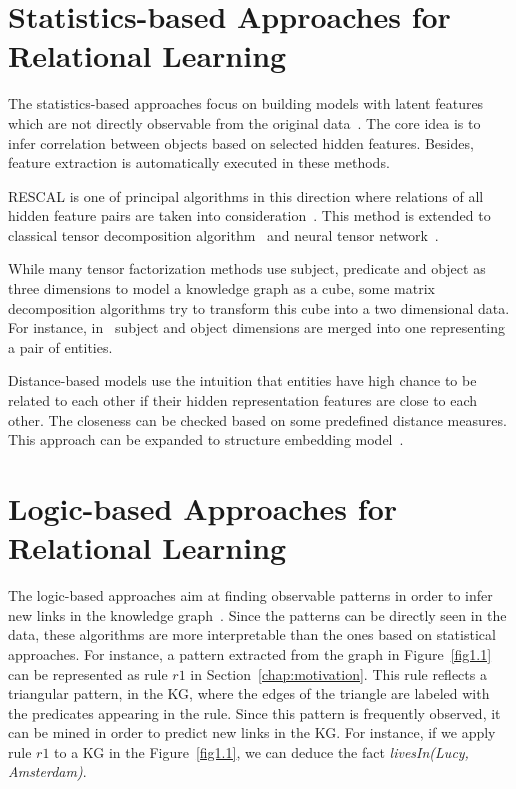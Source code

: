 \section{Statistics-based Approaches for Relational Learning}

The statistics-based approaches focus on building models with latent features which are not directly observable from the original data~\cite{ref1}. The core idea is to infer correlation between objects based on selected hidden features. Besides, feature extraction is automatically executed in these methods.

RESCAL is one of principal algorithms in this direction where relations of all hidden feature pairs are taken into consideration~\cite{ref2, ref3}. This method is extended to classical tensor decomposition algorithm~\cite{ref4} and neural tensor network~\cite{ref5}.

While many tensor factorization methods use subject, predicate and object as three dimensions to model a knowledge graph as a cube, some matrix decomposition algorithms try to transform this cube into a two dimensional data. For instance, in~\cite{ref6, ref7} subject and object dimensions are merged into one representing a pair of entities.

Distance-based models use the intuition that entities have high chance to be related to each other if their hidden representation features are close to each other. The closeness can be checked based on some predefined distance measures. This approach can be expanded to structure embedding model~\cite{ref8}.

\section{Logic-based Approaches for Relational Learning}

The logic-based approaches aim at finding observable patterns in order to infer new links in the knowledge graph~\cite{ref1}. Since the patterns can be directly seen in the data, these algorithms are more interpretable than the ones based on statistical approaches. For instance, a pattern extracted from the graph in Figure~\ref{fig1.1} can be represented as rule $r1$ in Section~\ref{chap:motivation}. This rule reflects a triangular pattern, in the KG, where the edges of the triangle are labeled with the predicates appearing in the rule. Since this pattern is frequently observed, it can be mined in order to predict new links in the KG. For instance, if we apply rule $r1$ to a KG in the Figure~\ref{fig1.1}, we can deduce the fact \textit{livesIn(Lucy, Amsterdam)}.

